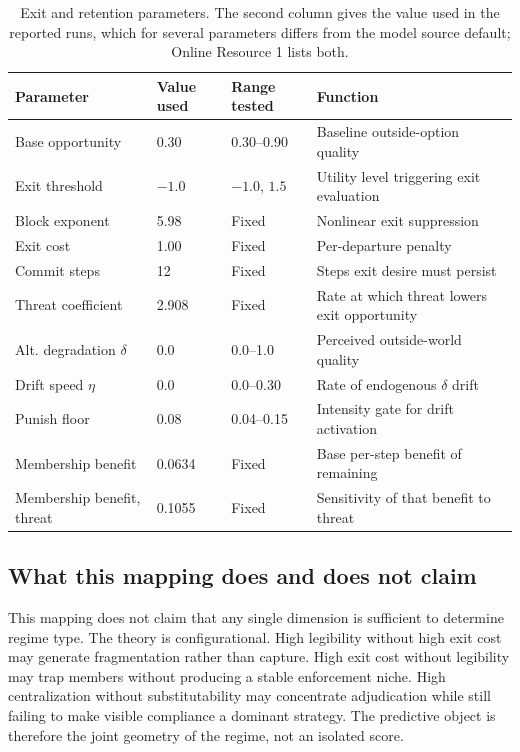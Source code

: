 \documentclass[12pt]{article}
\begin{document}
\begin{table}[ht]
\centering
\caption{Exit and retention parameters. The second column gives the value used in
the reported runs, which for several parameters differs from the model source
default; Online Resource 1 lists both.}
\label{tab:exit-params}
\begin{tabular}{llll}
\toprule
Parameter & Value used & Range tested & Function \\
\midrule
Base opportunity & 0.30 & 0.30--0.90 & Baseline outside-option quality \\
Exit threshold & $-1.0$ & $-1.0$, $1.5$ & Utility level triggering exit evaluation \\
Block exponent & 5.98 & Fixed & Nonlinear exit suppression \\
Exit cost & 1.00 & Fixed & Per-departure penalty \\
Commit steps & 12 & Fixed & Steps exit desire must persist \\
Threat coefficient & 2.908 & Fixed & Rate at which threat lowers exit opportunity \\
Alt. degradation $\delta$ & 0.0 & 0.0--1.0 & Perceived outside-world quality \\
Drift speed $\eta$ & 0.0 & 0.0--0.30 & Rate of endogenous $\delta$ drift \\
Punish floor & 0.08 & 0.04--0.15 & Intensity gate for drift activation \\
Membership benefit & 0.0634 & Fixed & Base per-step benefit of remaining \\
Membership benefit, threat & 0.1055 & Fixed & Sensitivity of that benefit to threat \\
\bottomrule
\end{tabular}
\end{table}

\subsection{What this mapping does and does not claim}

This mapping does not claim that any single dimension is sufficient to determine regime type. The theory is configurational. High legibility without high exit cost may generate fragmentation rather than capture. High exit cost without legibility may trap members without producing a stable enforcement niche. High centralization without substitutability may concentrate adjudication while still failing to make visible compliance a dominant strategy. The predictive object is therefore the joint geometry of the regime, not an isolated score.
\end{document}
